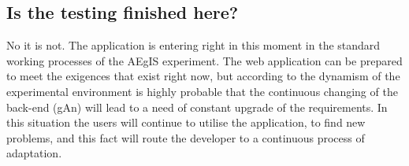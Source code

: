 \subsection{Is the testing finished here?}

No it is not. The application is entering right in this moment in the standard working processes of the AEgIS experiment. The web application can be prepared to meet the exigences that exist right now, but according to the dynamism of the experimental environment is highly probable that the continuous changing of the back-end (gAn) will lead to a need of constant upgrade of the requirements. In this situation the users will continue to utilise the application, to find new problems, and this fact will route the developer to a continuous process of adaptation.   